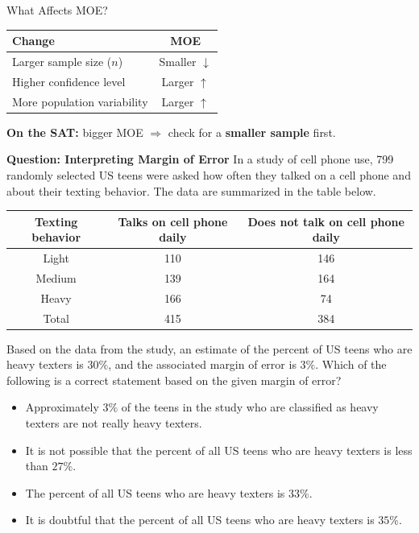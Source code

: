 \documentclass{beamer}
\begin{document}
\begin{frame}{What Affects MOE?}
\small

\begin{center}
\begin{tabular}{|l|c|}
\hline
\textbf{Change} & \textbf{MOE} \\
\hline
Larger sample size ($n$) & Smaller $\downarrow$ \\
\hline
Higher confidence level & Larger $\uparrow$ \\
\hline
More population variability & Larger $\uparrow$ \\
\hline
\end{tabular}
\end{center}

\vspace{0.25cm}
\textbf{On the SAT:} bigger MOE $\Rightarrow$ check for a \textbf{smaller sample} first.

\end{frame}

\begin{frame}{\textbf{Question: Interpreting Margin of Error }}
\footnotesize
In a study of cell phone use, 799 randomly selected US teens were asked how often they talked on a cell phone and about their texting behavior. The data are summarized in the table below.

\begin{center}
\begin{tabular}{|c|c|c|}
\hline
\textbf{Texting behavior} & \textbf{Talks on cell phone daily} & \textbf{Does not talk on cell phone daily}  \\
\hline
Light & 110 & 146  \\
Medium & 139 & 164 \\
Heavy & 166 & 74 \\
\hline
Total & 415 & 384  \\
\hline
\end{tabular}
\end{center}

Based on the data from the study, an estimate of the percent of US teens who are heavy texters is \( 30\% \), and the associated margin of error is \( 3\% \). Which of the following is a correct statement based on the given margin of error?

\begin{itemize}
    \item[A.] Approximately \( 3\% \) of the teens in the study who are classified as heavy texters are not really heavy texters.
    \item[B.] It is not possible that the percent of all US teens who are heavy texters is less than \( 27\% \).
    \item[C.] The percent of all US teens who are heavy texters is \( 33\% \).
    \item[D.] It is doubtful that the percent of all US teens who are heavy texters is \( 35\% \).
\end{itemize}
\end{frame}
\end{document}
